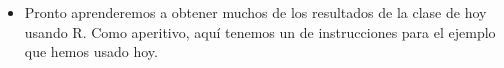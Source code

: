 \begin{itemize}
    \item Pronto aprenderemos a obtener muchos de los resultados de la clase de hoy usando R. Como aperitivo, aquí tenemos un  de instrucciones para el ejemplo que hemos usado hoy.

\end{itemize}

%

